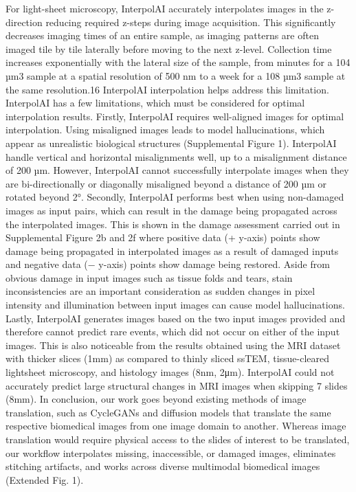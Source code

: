 \begin{refsection}
    For light-sheet microscopy, InterpolAI accurately interpolates images in the z-direction reducing required z-steps during image acquisition. This significantly decreases imaging times of an entire sample, as imaging patterns are often imaged tile by tile laterally before moving to the next z-level. Collection time increases exponentially with the lateral size of the sample, from minutes for a 104 µm3 sample at a spatial resolution of 500 nm to a week for a 108 µm3 sample at the same resolution.16 InterpolAI interpolation helps address this limitation. 
    InterpolAI has a few limitations, which must be considered for optimal interpolation results. Firstly, InterpolAI requires well-aligned images for optimal interpolation. Using misaligned images leads to model hallucinations, which appear as unrealistic biological structures (Supplemental Figure 1). InterpolAI handle vertical and horizontal misalignments well, up to a misalignment distance of 200 µm. However, InterpolAI cannot successfully interpolate images when they are bi-directionally or diagonally misaligned beyond a distance of 200 µm or rotated beyond 2°. Secondly, InterpolAI performs best when using non-damaged images as input pairs, which can result in the damage being propagated across the interpolated images. This is shown in the damage assessment carried out in Supplemental Figure 2b and 2f where positive data (+ y-axis) points show damage being propagated in interpolated images as a result of damaged inputs and negative data (− y-axis) points show damage being restored. Aside from obvious damage in input images such as tissue folds and tears, stain inconsistencies are an important consideration as sudden changes in pixel intensity and illumination between input images can cause model hallucinations. Lastly, InterpolAI generates images based on the two input images provided and therefore cannot predict rare events, which did not occur on either of the input images. This is also noticeable from the results obtained using the MRI dataset with thicker slices (1mm) as compared to thinly sliced ssTEM, tissue-cleared lightsheet microscopy, and histology images (8nm, 2μm). InterpolAI could not accurately predict large structural changes in MRI images when skipping 7 slides (8mm).
    In conclusion, our work goes beyond existing methods of image translation, such as CycleGANs and diffusion models that translate the same respective biomedical images from one image domain to another. Whereas image translation would require physical access to the slides of interest to be translated, our workflow interpolates missing, inaccessible, or damaged images, eliminates stitching artifacts, and works across diverse multimodal biomedical images (Extended Fig. 1).
    

\end{refsection}
